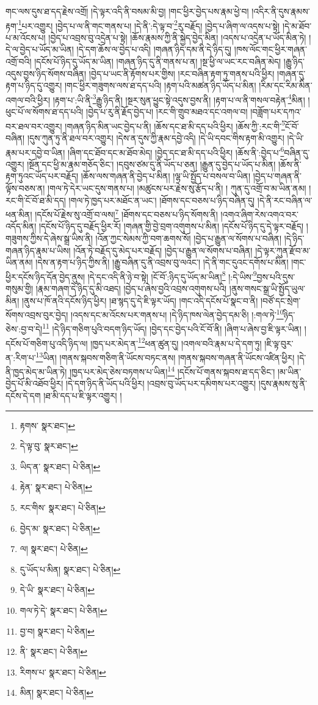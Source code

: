 གང་ལས་དུས་ཐ་དད་རྗེས་འགྲོ། །དེ་ལྟར་འདི་ནི་བསམ་མི་བྱ། །གང་ཕྱིར་བྱེད་པས་རྣམ་ཕྱེ་བ། །འདིར་ནི་དུས་རྣམས་རྟག་\footnote{རྟགས་  སྣར་ཐང་། }པར་འགྱུར། །བྱེད་པ་ལ་ནི་གང་གནས་པ། །དེ་ནི་:དེ་ལྟ་བ་\footnote{དེ་ལྟ་བུ་  སྣར་ཐང་། }རུ་བརྗོད། །བྱེད་པ་ཞིག་ལ་འདས་པ་སྟེ། །དེ་མ་ཐོབ་པ་མ་འོངས་པ། །བྱེད་པ་འབྲས་བུ་འདྲེན་པ་སྟེ། །ཆོས་རྣམས་ཀྱི་ནི་སྐྱེད་བྱེད་མིན། །འདས་པ་འདྲེན་པ་ཡོད་མིན་ཏེ། །དེ་ལ་བྱེད་པ་ཡོད་མ་ཡིན། །དེ་དག་ཆོས་ལ་བྱེད་པ་འདི། །གཞན་ཉིད་དམ་ནི་དེ་ཉིད་དུ། །ཁས་ལོང་གང་ཕྱིར་གཞན་འགྲོ་བའི། །དངོས་པོ་ཉིད་དུ་ཡོད་མ་ཡིན། །གཞན་ཉིད་དུ་ནི་གནས་པ་ན། །སྔ་ཕྱི་ལ་ཡང་རང་བཞིན་མེད། །རྒྱུ་ཉིད་འདུས་བྱས་ཉིད་སོགས་བཞིན། །བྱེད་པ་ཡང་ནི་རྟོགས་པར་གྱིས། །རང་བཞིན་རྟག་ཏུ་གནས་པའི་ཕྱིར། །གཞན་དུ་རྟག་པ་ཉིད་དུ་འགྱུར། །གང་ཕྱིར་གཟུགས་ལས་ཐ་དད་པའི། །རྟག་པའི་མཚན་ཉིད་ཡོད་པ་མིན། །རིམ་དང་རིམ་མིན་འགལ་བའི་ཕྱིར། །རྟག་པ་:ཡི་ནི་\footnote{ཡིད་ན་  སྣར་ཐང་།  པེ་ཅིན། }རྒྱུ་ཉིད་ནི། །སྔར་སུན་ཕྱུང་སྟེ་འདུས་བྱས་ནི། །རྟག་པ་ལ་ནི་གསལ་བརྟེན་\footnote{རྟེན་  སྣར་ཐང་།  པེ་ཅིན། }མིན། །ཕུང་པོ་ལ་སོགས་ཐ་དད་པའི། །བྱེད་པ་རུ་ནི་རྗོད་བྱེད་པ། །རང་གི་གྲུབ་མཐའ་དང་འགལ་བ། །བཟློག་པར་དཀའ་བར་ཐལ་བར་འགྱུར། །གཞན་ཉིད་མིན་ཡང་བྱེད་པ་ནི། །ཆོས་དང་ཐ་མི་དད་པའི་ཕྱིར། །ཆོས་ཀྱི་:རང་གི་\footnote{རང་གིས་  སྣར་ཐང་།  པེ་ཅིན། }ངོ་བོ་བཞིན། །དུས་ཀུན་ཏུ་ནི་ཐལ་བར་འགྱུར། །དེས་ན་དུས་ཀྱི་རྣམ་དབྱེ་འདི། །དེ་ཡི་དབང་གིས་རྟག་མི་འགྱུར། །དེ་ཡི་རྣམ་པར་དབྱེ་བ་ཡིན། །ཞིག་དང་ཐོབ་དང་མ་ཐོབ་མེད། །བྱེད་དང་ཐ་མི་དད་པའི་ཕྱིར། །ཆོས་ནི་:བྱེད་པ་\footnote{བྱེད་མ་  སྣར་ཐང་།  པེ་ཅིན། }བཞིན་དུ་འགྱུར། །སྔོན་དང་ཕྱི་མ་རྣམ་གཅོད་ཅིང་། །དབུས་ཙམ་དུ་ནི་ཡོད་པ་ཅན། །རྒྱུན་དུ་བྱེད་པ་ཡོད་པ་མིན། །ཆོས་ནི་རྟག་ཏུའང་ཡོད་པར་བརྗོད། །ཆོས་ལས་གཞན་ནི་བྱེད་པ་མིན། །ལྷ་ཡི་སྤྱོད་པ་བསལ་བ་ཡིན། །བྱེད་པ་གཞན་ནི་ལྟོས་བཅས་ན། །གལ་ཏེ་དེར་ཡང་དུས་གནས་པ། །མཚུངས་པར་རྗེས་སུ་རྩོད་པ་ནི། །
ཀུན་དུ་འགྲོ་བ་མ་ཡིན་ནམ། །རང་གི་ངོ་བོ་ཐ་མི་དད། །གལ་ཏེ་ཁྱད་པར་མཐོང་ན་ཡང་། །ཐོགས་དང་བཅས་པ་ཉིད་བཞིན་དུ། །དེ་ནི་རང་བཞིན་ལ་ཕན་མིན། །དངོས་པོ་རྗེས་སུ་འགྲོ་བ་ལས།\footnote{ལ།  སྣར་ཐང་།  པེ་ཅིན། } །ཐོགས་དང་བཅས་པ་ཉིད་སོགས་ནི། །འགའ་ཞིག་རེས་འགའ་བར་འདོད་མིན། །དངོས་པོ་ཉིད་དུ་བརྗོད་ཕྱིར་རོ། །གཞན་གྱི་བྱེ་བྲག་འགུགས་པ་མིན། །དངོས་པོ་ཉིད་དུ་དེ་ལྟར་བརྗོད། །གཟུགས་ཀྱིས་དེ་ཞེས་སྒྲ་ཡིས་ནི། །འོན་ཀྱང་སེམས་ཀྱི་བག་ཆགས་སོ། །བྱེད་པ་རྒྱུན་ལ་སོགས་པ་བཞིན། །དེ་ཉིད་གཞན་ཉིད་རྣམ་པ་ཡིས། །འོན་ཏེ་བརྗོད་དུ་མེད་པར་བརྗོད། །བྱེད་པ་རྒྱུན་ལ་སོགས་པ་བཞིན། །དེ་ལྟར་ཀུན་རྫོབ་མ་ཡིན་ནམ། །དེས་ན་རྟག་པ་ཉིད་ཀྱིས་ནི། །རྒྱུ་བཞིན་དུ་ནི་འབྲས་བུ་ལའང་། །དེ་ནི་གང་དུའང་དགོས་པ་མིན། །གང་ཕྱིར་དངོས་ཉིད་དོན་བྱེད་ནུས། །དེ་དང་འདི་ནི་ཉེ་བ་སྟེ། །ངོ་བོ་:ཉིད་དུ་ཡོད་མ་ཡིན།\footnote{དུ་ཡོད་པ་མིན།  སྣར་ཐང་།  པེ་ཅིན། } །:དེ་ཡིས་\footnote{དེ་ཡི་  སྣར་ཐང་།  པེ་ཅིན། }བྱས་པའི་དུས་གསུམ་གྱི། །རྣམ་གཞག་དེ་ཉིད་དུ་མི་འཐད། །བྱེད་པ་ཞེས་བྱའི་འབྲས་འགུགས་པའི། །ནུས་གསང་སྒྲ་ཡི་སྤྱོད་ཡུལ་མིན། །ནུས་པ་ཁོ་ནའི་དངོས་ཉིད་ཕྱིར། །ཐ་སྙད་དུ་དེ་ཇི་ལྟར་ཡོད། །གང་འདི་དངོས་པོ་སྣང་བ་ནི། །བཙོ་དང་སྲེག་སོགས་འབྲས་བུར་བྱེད། །འདས་དང་མ་འོངས་པར་གནས་པ། །དེ་ཉིད་ཁས་ལེན་བྱེད་དམ་ཅི། །:གལ་ཏེ་\footnote{གལ་ཏེ་དེ་  སྣར་ཐང་།  པེ་ཅིན། }ཉིད་ཅེས་:བྱ་བ་དེ།\footnote{བྱ་བ།  སྣར་ཐང་།  པེ་ཅིན། } །དེ་ཉིད་གཅིག་པུའི་བདག་ཉིད་ཡོད། །བྱེད་དང་བྱེད་པའི་ངོ་བོ་ནི། །ཞིག་པ་ཞེས་བྱ་ཇི་ལྟར་ཡིན། །དངོས་པོ་གཅིག་པུ་འདི་ཉིད་ལ། །ཁྱད་པར་མེད་ན་\footnote{ནི་  སྣར་ཐང་།  པེ་ཅིན། }ཕན་ཚུན་དུ། །འགལ་བའི་རྣམ་པ་དེ་དག་ཏུ། །ཇི་ལྟ་བུར་ན་:རིག་པ་\footnote{རིགས་པ་  སྣར་ཐང་།  པེ་ཅིན། }ཡིན། །གནས་སྐབས་གཅིག་ནི་ཡོངས་བཏང་ནས། །གནས་སྐབས་གཞན་ནི་ཡོངས་འཛིན་ཕྱིར། །དེ་ནི་ཁྱད་མེད་མ་ཡིན་ཏེ། །ཁྱད་པར་མེད་ཅེས་བཏགས་པ་ཡིན།\footnote{མིན།  སྣར་ཐང་།  པེ་ཅིན། } །དངོས་པོ་གནས་སྐབས་ཐ་དད་ཅིང་། །མ་ཡིན་བྱེད་པོ་མི་འཐོབ་ཕྱིར། །དེ་དག་ཉིད་ནི་ཡོད་པའི་ཕྱིར། །འབྲས་བུ་ཡོད་པར་དམིགས་པར་འགྱུར། །དུས་རྣམས་སུ་ནི་དངོས་དེ་དག །ཐ་མི་དད་པ་ཇི་ལྟར་འགྱུར། །
